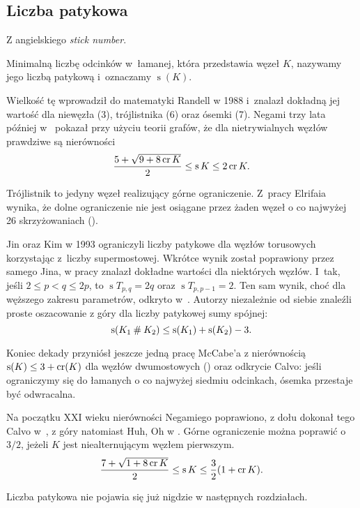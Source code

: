 
\subsection{Liczba patykowa} %
\label{sub:stick_index}
Z angielskiego \emph{stick number}.

\begin{definition}
    Minimalną liczbę odcinków w~łamanej, która przedstawia węzeł $K$, nazywamy jego liczbą patykową i~oznaczamy $\operatorname{s}(K)$.
\end{definition}

Wielkość tę wprowadził do matematyki Randell w 1988 i~znalazł dokładną jej wartość dla niewęzła (3), trójlistnika (6) oraz ósemki (7).
Negami trzy lata później w~\cite{negami91} pokazał przy użyciu teorii grafów, że dla nietrywialnych węzłów prawdziwe są nierówności
\begin{equation}
    \frac{5+\sqrt{9 + 8 \operatorname{cr} K}}{2} \le \operatorname{s} K \le 2 \operatorname{cr} K.
\end{equation}

Trójlistnik to jedyny węzeł realizujący górne ograniczenie.
Z~pracy Elrifaia wynika, że dolne ograniczenie nie jest osiągane przez żaden węzeł o co najwyżej 26 skrzyżowaniach (\cite{elrifai06}).

Jin oraz Kim w 1993 ograniczyli liczby patykowe dla węzłów torusowych korzystając z~liczby supermostowej.
Wkrótce wynik został poprawiony przez samego Jina, w pracy \cite{jin97} znalazł dokładne wartości dla niektórych węzłów.
I~tak, jeśli $2 \le p < q \le 2p$, to $\operatorname{s} T_{p,q} = 2q$ oraz $\operatorname{s} T_{p, p-1} = 2$.
Ten sam wynik, choć dla węższego zakresu parametrów, odkryto w~\cite{greilsheimer97}.
Autorzy niezależnie od siebie znaleźli proste oszacowanie z góry dla liczby patykowej sumy spójnej:
\begin{equation}
    \operatorname{s}(K_1 \mathbin{\#} K_2) \le \operatorname{s}(K_1) + \operatorname{s}(K_2) - 3.
\end{equation}

Koniec dekady przyniósł jeszcze jedną pracę McCabe'a z nierównością $\operatorname{s}(K) \le 3 + \operatorname{cr} (K)$ dla węzłów dwumostowych (\cite{mccabe98}) oraz odkrycie Calvo: jeśli ograniczymy się do łamanych o co najwyżej siedmiu odcinkach, ósemka przestaje być odwracalna.

Na początku XXI wieku nierówności Negamiego poprawiono, z dołu dokonał tego Calvo w~\cite{calvo01}, z góry natomiast Huh, Oh w \cite{huh11}.
Górne ograniczenie można poprawić o $3/2$, jeżeli $K$ jest niealternującym węzłem pierwszym.
\begin{equation}
    \frac{7+\sqrt{1 + 8 \operatorname{cr} K}}{2} \le \operatorname{s} K \le \frac{3}{2} (1 + \operatorname{cr} K).
\end{equation}

Liczba patykowa nie pojawia się już nigdzie w następnych rozdziałach.

